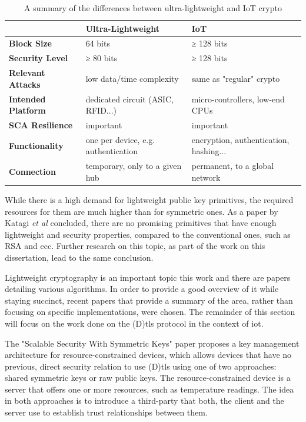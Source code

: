 \documentclass{llncs}
\begin{document}
\begin{table}[]
\centering
\caption{A summary of the differences between ultra-lightweight and IoT crypto}
\label{ul-iot}
\begin{tabular}{@{}lll@{}}
\toprule
                           & \textbf{Ultra-Lightweight}          & \textbf{IoT}                           \\ \midrule
\textbf{Block Size}        & 64 bits                             & ≥ 128 bits                             \\
\textbf{Security Level}    & ≥ 80 bits                           & ≥ 128 bits                             \\
\textbf{Relevant Attacks}  & low data/time complexity            & same as "regular" crypto               \\
\textbf{Intended Platform} & dedicated circuit (ASIC, RFID...)   & micro-controllers, low-end CPUs        \\
\textbf{SCA Resilience}    & important                           & important                              \\
\textbf{Functionality}     & one per device, e.g. authentication & encryption, authentication, hashing... \\
\textbf{Connection}        & temporary, only to a given hub      & permanent, to a global network         \\ \bottomrule
\end{tabular}
\end{table}

While there is a high demand for lightweight public key primitives, the required
resources for them are much higher than for symmetric ones. As a
paper by Katagi \textit{et al}\cite{b5b8db9716:online}
concluded, there are no promising primitives
that have enough lightweight and security properties, compared to the
conventional ones, such as RSA and \gls{ecc}. Further research on this topic, as part of the work on this dissertation, lead to the same conclusion.

Lightweight cryptography is an important topic this work and there are papers detailing
various algorithms. In order to provide a good overview of it while staying succinct, recent papers that provide a summary of the
area, rather than focusing on specific implementations, were chosen.
The remainder of this section will focus on the work done on the (D)\gls{tls} protocol in the context of \gls{iot}.

The "Scalable Security With Symmetric Keys"\cite{S3KScala62:online} paper proposes a key management architecture for resource-constrained devices,
which allows devices that have no previous, direct security relation to use
(D)\gls{tls} using one of two approaches: shared symmetric keys or raw public keys.
The resource-constrained device is a server that offers one or more resources,
such as temperature readings. The idea in both approaches is to introduce a third-party
 that both, the client and the server use to establish
trust relationships between them.
\end{document}
